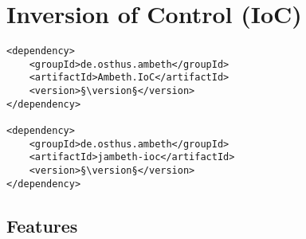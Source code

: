 \section{Inversion of Control (IoC)}
\label{module:IoC}
\ClearAPI
\TODO

\begin{lstlisting}[style=POM,caption={Maven modules to use \emph{Ambeth IoC}}]
<dependency>
	<groupId>de.osthus.ambeth</groupId>
	<artifactId>Ambeth.IoC</artifactId>
	<version>§\version§</version>
</dependency>

<dependency>
	<groupId>de.osthus.ambeth</groupId>
	<artifactId>jambeth-ioc</artifactId>
	<version>§\version§</version>
</dependency>
\end{lstlisting}
\subsection{Features}
